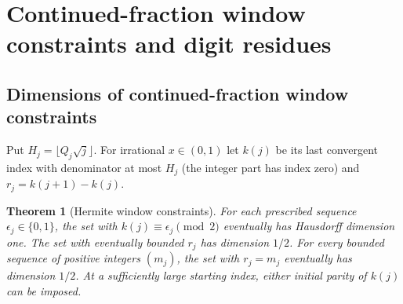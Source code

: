 \documentclass[11pt]{article}
\newtheorem{theorem}{Theorem}
\theoremstyle{definition}
\theoremstyle{remark}
\begin{document}
\section{Continued-fraction window constraints and digit residues}\label{sec:windows-residues}

\subsection{Dimensions of continued-fraction window constraints}

Put $H_j=\lfloor Q_j\sqrt j\rfloor$. For irrational $x\in(0,1)$ let
$k(j)$ be its last convergent index with denominator at most $H_j$
(the integer part has index zero) and $r_j=k(j+1)-k(j)$.

\begin{theorem}[Hermite window constraints]\label{thm:windows}
For each prescribed sequence $\epsilon_j\in\{0,1\}$, the set with
$k(j)\equiv\epsilon_j\pmod2$ eventually has Hausdorff dimension one.
The set with eventually bounded $r_j$ has dimension $1/2$.
For every bounded sequence of positive integers $(m_j)$, the set
with $r_j=m_j$ eventually has dimension $1/2$. At a sufficiently
large starting index, either initial parity of $k(j)$ can be imposed.
\end{theorem}
\end{document}
